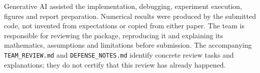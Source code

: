 \documentclass[11pt,a4paper]{article}
\newcommand{\code}[1]{\texttt{\small #1}}
\begin{document}
Generative AI assisted the implementation, debugging, experiment execution,
figures and report preparation. Numerical results were produced by the submitted
code, not invented from expectations or copied from either paper. The team is
responsible for reviewing the package, reproducing it and explaining its
mathematics, assumptions and limitations before submission. The accompanying
\code{TEAM\_REVIEW.md} and \code{DEFENSE\_NOTES.md} identify concrete review
tasks and explanations; they do not certify that this review has already happened.
\end{document}

